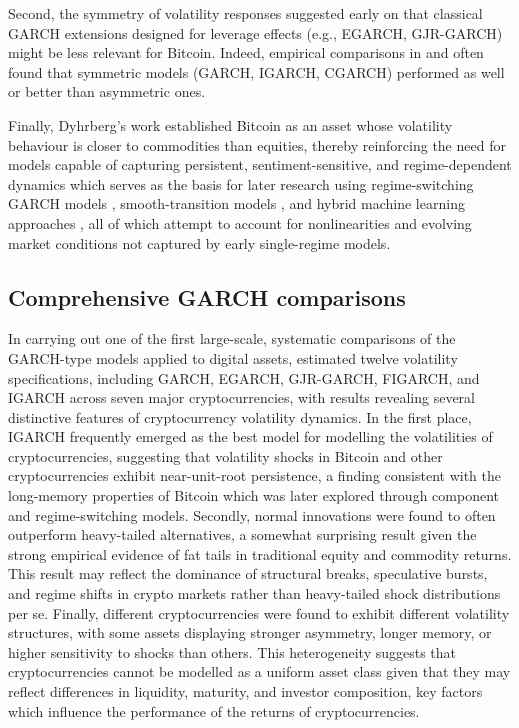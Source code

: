 \documentclass[12pt]{report}
\begin{document}
Second, the symmetry of volatility responses suggested early on that classical GARCH extensions designed for leverage effects (e.g., EGARCH, GJR-GARCH) might be less relevant for Bitcoin. Indeed, empirical comparisons in \cite{chu2017garchcrypto} and \cite{katsiampa2017volatility} often found that symmetric models (GARCH, IGARCH, CGARCH) performed as well or better than asymmetric ones.

Finally, Dyhrberg’s work established Bitcoin as an asset whose volatility behaviour is closer to commodities than equities, thereby reinforcing the need for models capable of capturing persistent, sentiment-sensitive, and regime-dependent dynamics which serves as the basis for later research using regime-switching GARCH models \citep{ardia2019regime}, smooth-transition 
models \citep{bencheikh2020stgarch}, and hybrid machine learning approaches 
\citep{zahidetal2022hybridgarch, han2025combinedmethod}, all of which attempt to account for nonlinearities and evolving market conditions not captured by early single-regime models.


\subsection{Comprehensive GARCH comparisons}
In carrying out one of the first large-scale, systematic comparisons of the GARCH-type models applied to digital assets, \cite{chu2017garchcrypto} estimated twelve volatility specifications, including GARCH, EGARCH, GJR-GARCH, FIGARCH, and IGARCH across seven major cryptocurrencies, with results revealing several distinctive features of cryptocurrency volatility dynamics.
In the first place, IGARCH frequently emerged as the best model for modelling the volatilities of cryptocurrencies, suggesting that volatility shocks in Bitcoin and other cryptocurrencies exhibit near-unit-root persistence, a finding consistent with the long-memory properties of Bitcoin which was later explored through component and regime-switching models.
Secondly, normal innovations were found to often outperform heavy-tailed alternatives, a somewhat surprising result given the strong empirical evidence of fat tails in traditional equity and commodity returns. This result may reflect the dominance of structural breaks, speculative bursts, and regime shifts in crypto markets rather than heavy-tailed shock distributions per se.
Finally, different cryptocurrencies were found to exhibit different volatility structures, with some assets displaying stronger asymmetry, longer memory, or higher sensitivity to shocks than others. This heterogeneity suggests that cryptocurrencies cannot be modelled as a uniform asset class given that they may reflect differences in liquidity, maturity, and investor composition, key factors which influence the performance of the returns of cryptocurrencies.
\end{document}
